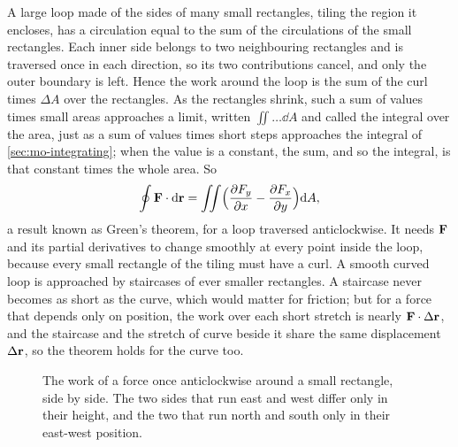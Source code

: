 \begin{toolbox}
A large loop made of the sides of many small rectangles, tiling the
region it encloses, has a circulation equal to the sum of the
circulations of the small rectangles. Each inner side belongs to two
neighbouring rectangles and is traversed once in each direction, so its
two contributions cancel, and only the outer boundary is left. Hence the
work around the loop is the sum of the curl times $\Delta A$ over the
rectangles. As the rectangles shrink, such a sum of values times small
areas approaches a limit, written $\iint\dots\dd A$ and called the
integral over the area, just as a sum of values times short steps
approaches the integral of \cref{sec:mo-integrating}; when the value is a
constant, the sum, and so the integral, is that constant times the whole
area. So
\begin{equation*}
   \oint\bm{\mathrm{F}}\cdot\mathrm{d}\bm{\mathrm{r}} = \iint\Bigl(\frac{\partial F_y}{\partial x}
   - \frac{\partial F_x}{\partial y}\Bigr)\mathrm{d} A ,
\end{equation*}
a result known as Green's theorem, for a loop traversed anticlockwise. It
needs $\bm{\mathrm{F}}$ and its partial derivatives to change smoothly at every
point inside the loop, because every small rectangle of the tiling must
have a curl. A smooth curved loop is approached by staircases of ever
smaller rectangles. A staircase never becomes as short as the curve, which
would matter for friction; but for a force that depends only on position,
the work over each short stretch is nearly $\bm{\mathrm{F}}\cdot\Delta\bm{\mathrm{r}}$, and
the staircase and the stretch of curve beside it share the same
displacement $\Delta\bm{\mathrm{r}}$, so the theorem holds for the curve too.
\end{toolbox}

\begin{figure}[htb]
\centering
{}
\caption{The work of a force once anticlockwise around a small rectangle,
side by side. The two sides that run east and west differ only in their
height, and the two that run north and south only in their east-west
position.}
\label{fig:en-loop}
\end{figure}

